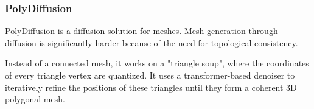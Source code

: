 \subsubsection{PolyDiffusion}
PolyDiffusion is a diffusion solution for meshes. Mesh generation through diffusion is significantly harder because of the need for topological consistency.\par
Instead of a connected mesh, it works on a "triangle soup", where the coordinates of every triangle vertex are quantized. It uses a transformer-based denoiser to iteratively refine the positions of these triangles until they form a coherent 3D polygonal mesh.
